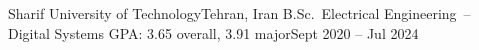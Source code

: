 \resumeSubheading
  {Sharif University of Technology}{Tehran, Iran}
  {B.Sc.\ Electrical Engineering~-- Digital Systems \quad GPA: 3.65 overall, 3.91 major}{Sept 2020 -- Jul 2024}
